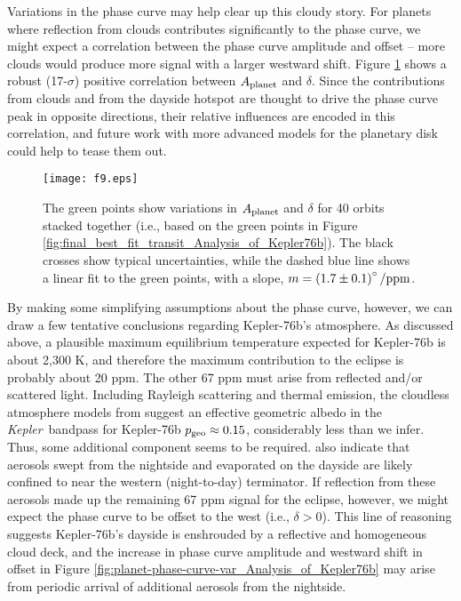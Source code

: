 \documentclass[manuscript]{aastex62}
\newcommand{\kepler}{{\it Kepler}}
\begin{document}
Variations in the phase curve may help clear up this cloudy story. For planets where reflection from clouds contributes significantly to the phase curve, we might expect a correlation between the phase curve amplitude and offset -- more clouds would produce more signal with a larger westward shift. Figure \ref{fig:Aplanet-delta-var_Analysis_of_Kepler76b} shows a robust (17-$\sigma$) positive correlation between $A_{\rm planet}$ and $\delta$. Since the contributions from clouds and from the dayside hotspot are thought to drive the phase curve peak in opposite directions, their relative influences are encoded in this correlation, and future work with more advanced models for the planetary disk \citep[e.g.,][]{2017ascl.soft11019L} could help to tease them out.

\begin{figure}
\texttt{[image: f9.eps]}
\caption{The green points show variations in $A_{\rm planet}$ and $\delta$ for 40 orbits stacked together (i.e., based on the green points in Figure \ref{fig:final_best_fit_transit_Analysis_of_Kepler76b}). The black crosses show typical uncertainties, while the dashed blue line shows a linear fit to the green points, with a slope, $m = \left( 1.7 \pm 0.1 \right) ^\circ/{\rm ppm}$. \label{fig:Aplanet-delta-var_Analysis_of_Kepler76b}}
\end{figure}

By making some simplifying assumptions about the phase curve, however, we can draw a few tentative conclusions regarding Kepler-76b's atmosphere. As discussed above, a plausible maximum equilibrium temperature expected for Kepler-76b is about 2,300 K, and therefore the maximum contribution to the eclipse is probably about 20 ppm. The other 67 ppm must arise from reflected and/or scattered light. Including Rayleigh scattering and thermal emission, the cloudless atmosphere models from \citet{2016ApJ...828...22P} suggest an effective geometric albedo in the \kepler\ bandpass for Kepler-76b $p_{\rm geo} \approx 0.15$, considerably less than we infer. Thus, some additional component seems to be required. \citet{2016ApJ...828...22P} also indicate that aerosols swept from the nightside and evaporated on the dayside are likely confined to near the western (night-to-day) terminator. If reflection from these aerosols made up the remaining 67 ppm signal for the eclipse, however, we might expect the phase curve to be offset to the west (i.e., $\delta > 0$). This line of reasoning suggests Kepler-76b's dayside is enshrouded by a reflective and homogeneous cloud deck, and the increase in phase curve amplitude and westward shift in offset in Figure \ref{fig:planet-phase-curve-var_Analysis_of_Kepler76b} may arise from periodic arrival of additional aerosols from the nightside.
\end{document}
